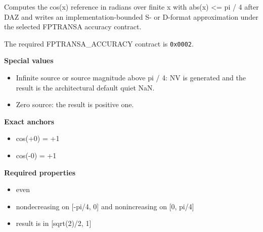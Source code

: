 Computes the cos(x) reference in radians over finite x with abs(x) \textless{}= pi / 4 after DAZ and writes an implementation-bounded S- or D-format approximation under the selected FPTRANSA accuracy contract.

The required FPTRANSA\_ACCURACY contract is \texttt{0x0002}.

\textbf{Special values}\par
\begin{itemize}
\item Infinite source or source magnitude above pi / 4: NV is generated and the result is the architectural default quiet NaN.
\item Zero source: the result is positive one.
\end{itemize}

\textbf{Exact anchors}\par
\begin{itemize}
\item cos(+0) = +1
\item cos(-0) = +1
\end{itemize}

\textbf{Required properties}\par
\begin{itemize}
\item even
\item nondecreasing on [-pi/4, 0] and nonincreasing on [0, pi/4]
\item result is in [sqrt(2)/2, 1]
\end{itemize}
